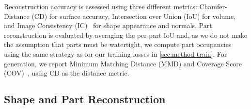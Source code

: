 
 Reconstruction accuracy is assessed using three different metrics: Chamfer-Distance (CD) for surface accuracy, Intersection over Union (IoU) for volume, and Image Consistency (IC)~\cite{Guillard22b} for shape appearance and normals. Part reconstruction is evaluated by averaging the per-part IoU and, as we do not make the assumption that parts must be watertight, we compute part occupancies using the same strategy as for  our training losses in \cref{sec:method-train}. For generation, we report Minimum Matching Distance (MMD) and Coverage Score (COV)~\cite{Achlioptas18b}, using CD as the distance metric.

\subsection{Shape and Part Reconstruction}
\label{sec:exp-recon}




